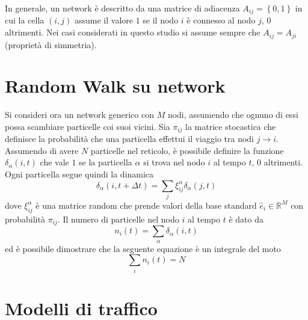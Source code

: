 \documentclass[../main.tex]{subfiles}
\begin{document}
In generale, un network è descritto da una matrice di adiacenza $A_{ij}=\left\{0,1\right\}$ in cui la cella $(i,j)$ assume il valore $1$ se il nodo $i$ è connesso al nodo $j$, $0$ altrimenti.
Nei casi considerati in questo studio si assume sempre che $A_{ij}=A_{ji}$ (proprietà di simmetria).


\section*{Random Walk su network}
Si consideri ora un network generico con $M$ nodi, assumendo che ognuno di essi possa scambiare particelle coi suoi vicini.
Sia $\pi_{ij}$ la matrice stocastica che definisce la probabilità che una particella effettui il viaggio tra nodi $j\to i$.
Assumendo di avere $N$ particelle nel reticolo, è possibile definire la funzione $\delta_\alpha(i,t)$ che vale $1$ se la particella $\alpha$ si trova nel nodo $i$ al tempo $t$, 0 altrimenti.
\\Ogni particella segue quindi la dinamica
\begin{equation}
    \delta_\alpha(i,t+\Delta t)=\sum_j\xi_{ij}^\alpha\delta_\alpha(j,t)
\end{equation}
dove $\xi_{ij}^\alpha$ è una matrice random che prende valori della base standard $\widehat{e}_i\in \mathbb{R}^M$ con probabilità $\pi_{ij}$.
Il numero di particelle nel nodo $i$ al tempo $t$ è dato da
\begin{equation}
    n_i(t)=\sum_\alpha\delta_\alpha(i,t)
\end{equation}
ed è possibile dimostrare \cite{RandomWalks} che la seguente equazione è un integrale del moto
\begin{equation}
    \sum_in_i(t)=N
\end{equation}

\section*{Modelli di traffico}
\end{document}
